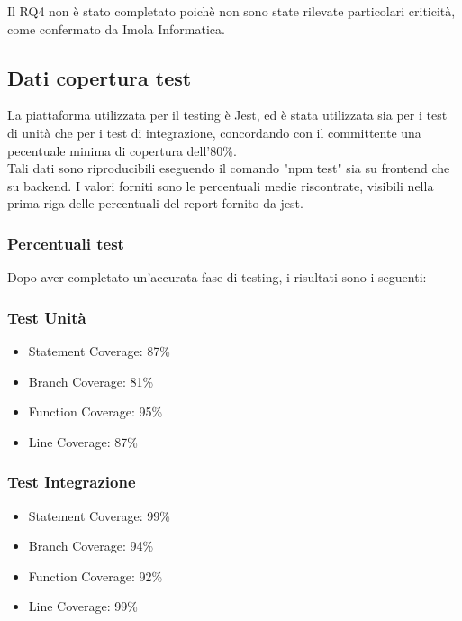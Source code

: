 \documentclass[12pt]{article}
\begin{document}
	Il RQ4 non è stato completato poichè non sono state rilevate particolari criticità, come confermato da Imola Informatica.
\subsection{Dati copertura test}
La piattaforma utilizzata per il testing è Jest, ed è stata utilizzata sia per i test di unità che per i test di integrazione, concordando con il committente una pecentuale minima di copertura dell'80\%.
\\Tali dati sono riproducibili eseguendo il comando "npm test" sia su frontend che su backend. I valori forniti sono le percentuali medie riscontrate, visibili nella prima riga delle percentuali del report fornito da jest.
	\subsubsection{Percentuali test}
	Dopo aver completato un'accurata fase di testing, i risultati sono i seguenti:
	\\
	\subsubsection{Test Unità}
	\begin{itemize}
		\item Statement Coverage: 87\%
		\item Branch Coverage: 81\%
		\item Function Coverage: 95\%
		\item Line Coverage: 87\%
	\end{itemize}
	\subsubsection{Test Integrazione}
	\begin{itemize}
		\item Statement Coverage: 99\%
		\item Branch Coverage: 94\%
		\item Function Coverage: 92\%
		\item Line Coverage: 99\%
	\end{itemize}
\end{document}
